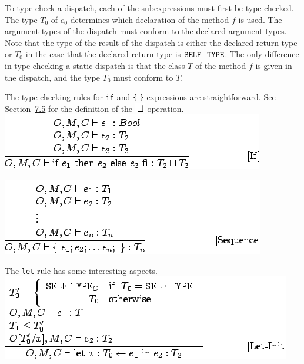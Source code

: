 \documentclass[]{article}
\begin{document}
To type check a dispatch, each of the subexpressions must first be type
checked. The type $T_0$ of $e_0$ determines which declaration of the
method $f$ is used. The argument types of the dispatch must conform to
the declared argument types. Note that the type of the result of the
dispatch is either the declared return type or $T_0$ in the case that
the declared return type is $\tt SELF\_TYPE$. The only difference in
type checking a static dispatch is that the class $ T$ of the method $f$
is given in the dispatch, and the type $T_0$ must conform to $ T$.

The type checking rules for \texttt{if} and \texttt{\{}-\texttt{\}}
expressions are straightforward. See
Section~\href{node18.html\#sec-cond}{7.5} for the definition of the
\includegraphics{img21.png} operation. \\

\includegraphics{img88.png}

\includegraphics{img89.png}

The \texttt{let} rule has some interesting aspects. \\

\includegraphics{img90.png}
\end{document}
